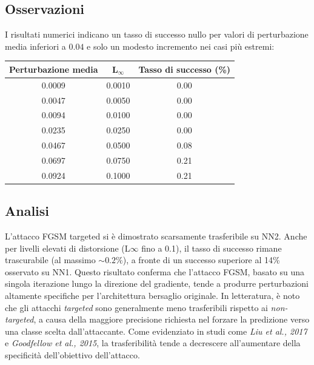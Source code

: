         \subsection{Osservazioni}
            I risultati numerici indicano un tasso di successo nullo per valori di perturbazione media inferiori a $0.04$ e solo un modesto incremento nei casi più estremi:
                \begin{center}
                    \begin{tabular}{ccc}
                        \toprule
                        \textbf{Perturbazione media} & \textbf{L$_\infty$} & \textbf{Tasso di successo (\%)} \\
                        \midrule
                        0.0009 & 0.0010 & 0.00 \\
                        0.0047 & 0.0050 & 0.00 \\
                        0.0094 & 0.0100 & 0.00 \\
                        0.0235 & 0.0250 & 0.00 \\
                        0.0467 & 0.0500 & 0.08 \\
                        0.0697 & 0.0750 & 0.21 \\
                        0.0924 & 0.1000 & 0.21 \\
                        \bottomrule
                    \end{tabular}
                \end{center}

        \subsection{Analisi}
            L’attacco FGSM targeted si è dimostrato scarsamente trasferibile su NN2. Anche per livelli elevati di distorsione (L$\infty$ fino a 0.1), il tasso di successo rimane trascurabile (al massimo $\sim0.2\%$), a fronte di un successo superiore al 14\% osservato su NN1. Questo risultato conferma che l’attacco FGSM, basato su una singola iterazione lungo la direzione del gradiente, tende a produrre perturbazioni altamente specifiche per l’architettura bersaglio originale.
            In letteratura, è noto che gli attacchi \textit{targeted} sono generalmente meno trasferibili rispetto ai \textit{non-targeted}, a causa della maggiore precisione richiesta nel forzare la predizione verso una classe scelta dall’attaccante. Come evidenziato in studi come \textit{Liu et al., 2017} e \textit{Goodfellow et al., 2015}, la trasferibilità tende a decrescere all’aumentare della specificità dell’obiettivo dell’attacco.

